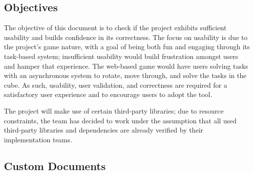 \documentclass[12pt, titlepage]{article}
\renewcommand{\wss}[1]{}
\begin{document}
\subsection{Objectives}

\wss{State what is intended to be accomplished.  The objective will be around
  the qualities that are most important for your project.  You might have
  something like: ``build confidence in the software correctness,''
  ``demonstrate adequate usability.'' etc.  You won't list all of the qualities,
  just those that are most important.}

\wss{You should also list the objectives that are out of scope.  You don't have 
the resources to do everything, so what will you be leaving out.  For instance, 
if you are not going to verify the quality of usability, state this.  It is also 
worthwhile to justify why the objectives are left out.}

\wss{The objectives are important because they highlight that you are aware of 
limitations in your resources for verification and validation.  You can't do everything, 
so what are you going to prioritize?  As an example, if your system depends on an 
external library, you can explicitly state that you will assume that external library 
has already been verified by its implementation team.}

The objective of this document is to check if the project exhibits sufficient usability and builds confidence in its correctness. The focus
on usability is due to the project's game nature, with a goal of being both fun and engaging through its task-based system; insufficient usability would
build frustration amongst users and hamper that experience. The web-based game would have users solving tasks with an asynchronous system to rotate,
move through, and solve the tasks in the cube. As such, usability, user validation, and correctness are required for a satisfactory user experience and to encourage
users to adopt the tool.

The project will make use of certain third-party libraries; due to resource constraints, the team has decided to work under the assumption that all used third-party
libraries and dependencies are already verified by their implementation teams.

\subsection{Custom Documents}

\wss{Summarize the CDs (Custom Documents) that were tackled by this project.  CDs 
can include usability testing, code walkthroughs, user documentation, formal
proof, GenderMag personas, Design Thinking, etc.  CDs should have already
been approved by the course instructor as included in your problem statement.
You can use a pull request to update your CDs (in TeamComposition.csv or
Repos.csv) if your plan changes as a result of the VnV planning exercise.}
\end{document}
